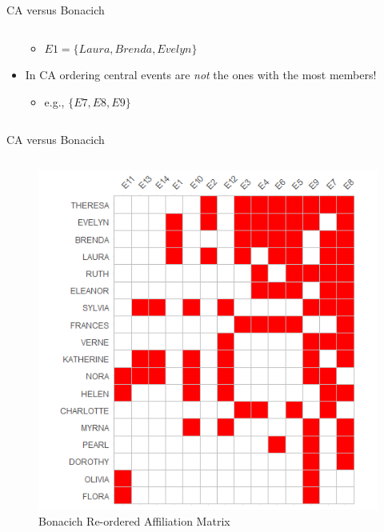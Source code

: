 \documentclass[
  ignorenonframetext,
]{beamer}
\providecommand{\tightlist}{%
  \setlength{\itemsep}{0pt}\setlength{\parskip}{0pt}}\usepackage{longtable,booktabs,array}
\begin{document}
\begin{frame}{CA versus Bonacich}
\begin{columns}[T]
\begin{column}{0.5\textwidth}
\begin{itemize}
  \begin{itemize}
  \tightlist
  \item
    \(E1 = \{Laura, Brenda, Evelyn\}\)
  \end{itemize}
\item
  In CA ordering central events are \emph{not} the ones with the most
  members!

  \begin{itemize}
  \tightlist
  \item
    e.g., \(\{E7, E8, E9\}\)
  \end{itemize}
\end{itemize}
\end{column}
\end{columns}
\end{frame}

\begin{frame}{CA versus Bonacich}
\protect\hypertarget{ca-versus-bonacich-13}{}
\begin{columns}[T]
\begin{column}{0.5\textwidth}
\begin{figure}

{\centering \includegraphics{Plots/bon-reord.png}

}

\caption{Bonacich Re-ordered Affiliation Matrix}


\end{figure}
\end{column}
\end{columns}
\end{frame}
\end{document}
